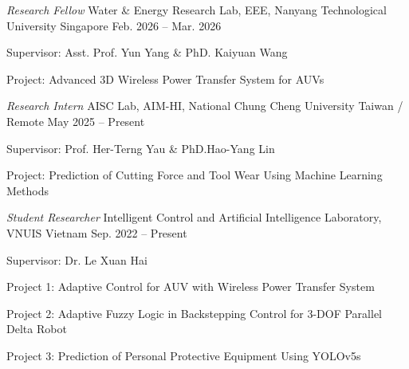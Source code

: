 \begin{cventries}
  \cventry
    {\textit{Research Fellow}}
    {Water \& Energy Research Lab, EEE, Nanyang Technological University}
    {Singapore}
    {Feb. 2026 -- Mar. 2026}
    {
      \begin{cvitems}
        \item {Supervisor: Asst. Prof. Yun Yang \& PhD. Kaiyuan Wang}
        \item {Project: Advanced 3D Wireless Power Transfer System for AUVs}
      \end{cvitems}
    }

  \cventry
    {\textit{Research Intern}}
    {AISC Lab, AIM-HI, National Chung Cheng University}
    {Taiwan / Remote}
    {May 2025 -- Present}
    {
      \begin{cvitems}
        \item {Supervisor: Prof. Her-Terng Yau \& PhD.Hao-Yang Lin}
        \item {Project: Prediction of Cutting Force and Tool Wear Using Machine Learning Methods}
      \end{cvitems}
    }

  \cventry
    {\textit{Student Researcher}}
    {Intelligent Control and Artificial Intelligence Laboratory, VNUIS}
    {Vietnam}
    {Sep. 2022 -- Present}
    {
      \begin{cvitems}
        \item {Supervisor: Dr. Le Xuan Hai}
        \item {Project 1: Adaptive Control for AUV with Wireless Power Transfer System}
        \item {Project 2: Adaptive Fuzzy Logic in Backstepping Control for 3-DOF Parallel Delta Robot}
        \item {Project 3: Prediction of Personal Protective Equipment Using YOLOv5s}
      \end{cvitems}
    }

\end{cventries}
